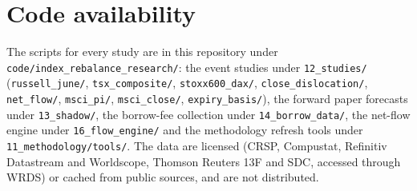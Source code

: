 \documentclass[10pt, a4paper, twocolumn]{article}
\begin{document}
\section*{Code availability}

{\raggedright
The scripts for every study are in this repository under \texttt{code/index\_rebalance\_research/}: the event studies under \texttt{12\_studies/} (\texttt{russell\_june/}, \texttt{tsx\_composite/}, \texttt{stoxx600\_dax/}, \texttt{close\_dislocation/}, \texttt{net\_flow/}, \texttt{msci\_pi/}, \texttt{msci\_close/}, \texttt{expiry\_basis/}), the forward paper forecasts under \texttt{13\_shadow/}, the borrow-fee collection under \texttt{14\_borrow\_data/}, the net-flow engine under \texttt{16\_flow\_engine/} and the methodology refresh tools under \texttt{11\_methodology/tools/}. The data are licensed (CRSP, Compustat, Refinitiv Datastream and Worldscope, Thomson Reuters 13F and SDC, accessed through WRDS) or cached from public sources, and are not distributed.\par}
\end{document}
